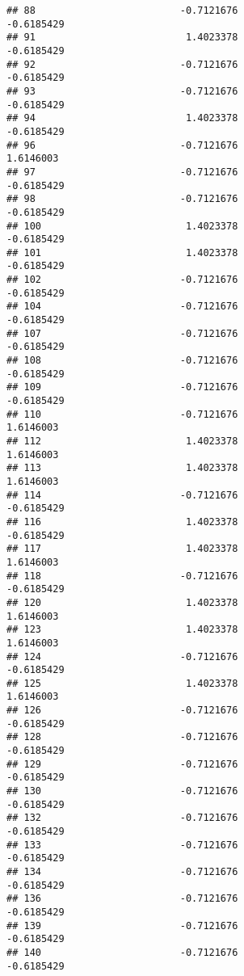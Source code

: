 \documentclass[
]{article}
\begin{document}
\begin{verbatim}
## 88                         -0.7121676                       -0.6185429
## 91                          1.4023378                       -0.6185429
## 92                         -0.7121676                       -0.6185429
## 93                         -0.7121676                       -0.6185429
## 94                          1.4023378                       -0.6185429
## 96                         -0.7121676                        1.6146003
## 97                         -0.7121676                       -0.6185429
## 98                         -0.7121676                       -0.6185429
## 100                         1.4023378                       -0.6185429
## 101                         1.4023378                       -0.6185429
## 102                        -0.7121676                       -0.6185429
## 104                        -0.7121676                       -0.6185429
## 107                        -0.7121676                       -0.6185429
## 108                        -0.7121676                       -0.6185429
## 109                        -0.7121676                       -0.6185429
## 110                        -0.7121676                        1.6146003
## 112                         1.4023378                        1.6146003
## 113                         1.4023378                        1.6146003
## 114                        -0.7121676                       -0.6185429
## 116                         1.4023378                       -0.6185429
## 117                         1.4023378                        1.6146003
## 118                        -0.7121676                       -0.6185429
## 120                         1.4023378                        1.6146003
## 123                         1.4023378                        1.6146003
## 124                        -0.7121676                       -0.6185429
## 125                         1.4023378                        1.6146003
## 126                        -0.7121676                       -0.6185429
## 128                        -0.7121676                       -0.6185429
## 129                        -0.7121676                       -0.6185429
## 130                        -0.7121676                       -0.6185429
## 132                        -0.7121676                       -0.6185429
## 133                        -0.7121676                       -0.6185429
## 134                        -0.7121676                       -0.6185429
## 136                        -0.7121676                       -0.6185429
## 139                        -0.7121676                       -0.6185429
## 140                        -0.7121676                       -0.6185429

\end{verbatim}
\end{document}
